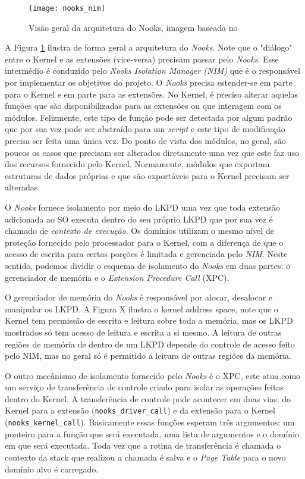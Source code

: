 \begin{figure}[!h]
  \centering
  \texttt{[image: nooks\_nim]}
  \caption{Visão geral da arquitetura do Nooks, imagem baseada no \citep{nooks}}
  \label{fig:nooks_nim}
\end{figure}

A Figura \ref{fig:nooks_nim} ilustra de forma geral a arquitetura do
\emph{Nooks}. Note que o "diálogo" entre o Kernel e as extensões (vice-versa)
precisam passar pelo \emph{Nooks}. Esse intermédio é conduzido pelo \emph{Nooks
Isolation Manager (NIM)} que é o responsável por implementar os objetivos do
projeto. O \emph{Nooks} precisa estender-se em parte para o Kernel e em parte
para as extensões. No Kernel, é preciso alterar aquelas funções que são
disponibilizadas para as extensões ou que interagem com os módulos. Felizmente,
este tipo de função pode ser detectada por algum padrão que por sua vez pode
ser abstraído para um \emph{script} e este tipo de modificação precisa ser
feita uma única vez. Do ponto de vista dos módulos, no geral, são poucos os
casos que precisam ser alterados diretamente uma vez que este faz uso dos
recursos fornecido pelo Kernel. Normamente, módulos que exportam estruturas de
dados próprias e que são exportáveis para o Kernel precisam ser alteradas.

O \emph{Nooks} fornece isolamento por meio do LKPD uma vez que toda extensão
adicionada ao SO executa dentro do seu próprio LKPD que por sua vez é chamado
de \emph{contexto de execução}. Os domínios utilizam o mesmo nível de proteção
fornecido pelo processador para o Kernel, com a diferença de que o acesso de
escrita para certas porções é limitada e gerenciada pelo \emph{NIM}. Neste
sentido, podemos dividir o esquema de isolamento do \emph{Nooks} em duas partes:
o gerenciador de memória e o \emph{Extension Procedure Call} (XPC).


O gerenciador de memória do \emph{Nooks} é responsável por alocar, desalocar e
manipular os LKPD. A Figura X ilustra o kernel address space, note que o Kernel
tem permissão de escrita e leitura sobre toda a memória, mas os LKPD mostrados
só tem acesso de leitura e escrita a si mesmo. A leitura de outras regiões de
memória de dentro de um LKPD depende do controle de acesso feito pelo NIM, mas
no geral só é permitido a leitura de outras regiões da memória.

O outro mecânismo de isolamento fornecido pelo \emph{Nooks} é o XPC, este atua
como um serviço de transferência de controle criado para isolar as operações
feitas dentro do Kernel. A transferência de controle pode acontecer em duas
vias: do Kernel para a extensão (\texttt{nooks\_driver\_call}) e da extensão
para o Kernel (\texttt{nooks\_kernel\_call}). Basicamente essas funções esperam
três argumentos: um ponteiro para a função que será executada, uma lista de
argumentos e o domínio em que será executada. Toda vez que a rotina de
transferência é chamada o contexto da stack que realizou a chamada é salva e o
\emph{Page Table} para o novo domínio alvo é carregado.

